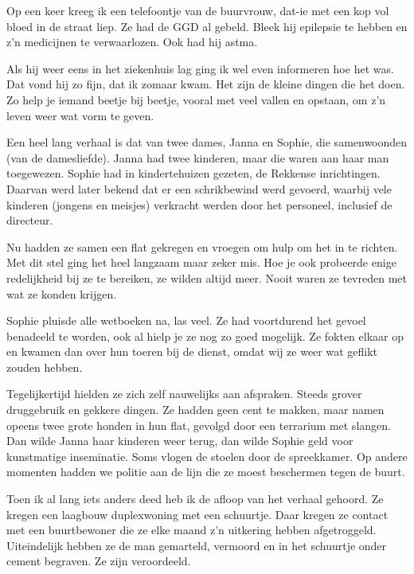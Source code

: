 \documentclass[12pt,twoside, openright]{memoir}
\begin{document}
Op een keer kreeg ik een telefoontje van de buurvrouw, dat-ie met een kop vol bloed in de straat liep. Ze had de GGD al gebeld. Bleek hij epilepsie te hebben en z’n medicijnen te verwaarlozen. Ook had hij astma. 

Als hij weer eens in het ziekenhuis lag ging ik wel even informeren hoe het was. Dat vond hij zo fijn, dat ik zomaar kwam. Het zijn de kleine dingen die het doen. Zo help je iemand beetje bij beetje, vooral met veel vallen en opstaan, om z’n leven weer wat vorm te geven.

Een heel lang verhaal is dat van twee dames, Janna en Sophie, die samenwoonden (van de damesliefde). Janna had twee kinderen, maar die waren aan haar man toegewezen. Sophie had in kindertehuizen gezeten, de Rekkense inrichtingen. Daarvan werd later bekend dat er een schrikbewind werd gevoerd, waarbij vele kinderen (jongens en meisjes) verkracht werden door het personeel, inclusief de directeur. 

Nu hadden ze samen een flat gekregen en vroegen om hulp om het in te richten. Met dit stel ging het heel langzaam maar zeker mis. Hoe je ook probeerde enige redelijkheid bij ze te bereiken, ze wilden altijd meer. Nooit waren ze tevreden met wat ze konden krijgen. 

Sophie pluisde alle wetboeken na, las veel. Ze had voortdurend het gevoel benadeeld te worden, ook al hielp je ze nog zo goed mogelijk. Ze fokten elkaar op en kwamen dan over hun toeren bij de dienst, omdat wij ze weer wat geflikt zouden hebben. 

Tegelijkertijd hielden ze zich zelf nauwelijks aan afspraken. Steeds grover druggebruik en gekkere dingen. Ze hadden geen cent te makken, maar namen opeens twee grote honden in hun flat, gevolgd door een terrarium met slangen. Dan wilde Janna haar kinderen weer terug, dan wilde Sophie geld voor kunstmatige inseminatie. Soms vlogen de stoelen door de spreekkamer. Op andere momenten hadden we politie aan de lijn die ze moest beschermen tegen de buurt. 

Toen ik al lang iets anders deed heb ik de afloop van het verhaal gehoord. Ze kregen een laagbouw duplexwoning met een schuurtje. Daar kregen ze contact met een buurtbewoner die ze elke maand z'n uitkering hebben afgetroggeld. Uiteindelijk hebben ze de man gemarteld, vermoord en in het schuurtje onder cement begraven. Ze zijn veroordeeld. 
\end{document}
